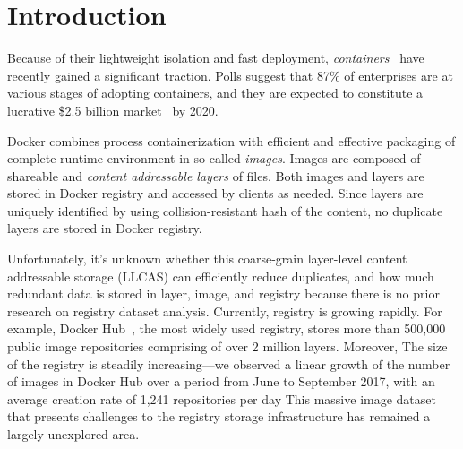 \section{Introduction}


%

Because of their lightweight isolation and fast deployment,
\emph{containers}~\cite{process-containers-linux} have recently gained a
significant traction.
%
Polls suggest that 87\% of enterprises are at various stages of adopting
containers, and they are expected to constitute a lucrative \$2.5 billion
market~\cite{container-grow-by2020} by 2020.

Docker combines process containerization with efficient and effective packaging
of complete runtime environment in so called {\em images}.
%
Images are composed of shareable and {\em content addressable layers} of files.
%
Both images and layers are stored in Docker registry and accessed by clients as
needed.
%
Since layers are uniquely identified by using collision-resistant hash of the
content, no duplicate layers are stored in Docker registry.

Unfortunately, it's unknown whether  this coarse-grain layer-level content
addressable storage (LLCAS) can efficiently reduce duplicates, and how much
redundant data is stored in layer, image, and registry because there is no
prior research on registry dataset analysis.
%
Currently, registry is growing rapidly.
%
For example,   Docker Hub~\cite{docker-hub}, the most widely used registry,
stores more than 500,000 public image repositories comprising of over 2 million
layers.
%
Moreover, The size of the registry is steadily increasing---we observed a
linear growth of the number of images in Docker Hub over a period from June to
September 2017, with an average creation rate of 1,241 repositories per day
%
%
This massive image dataset that presents challenges to the registry storage
infrastructure has remained a largely unexplored area.

